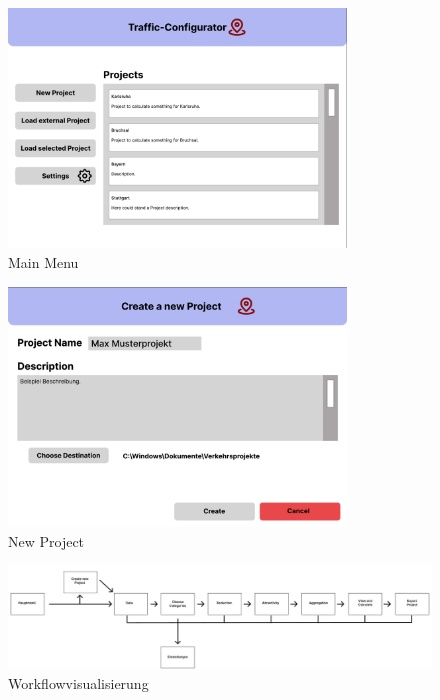 \documentclass[parskip=full]{scrartcl} %
\begin{document}
\FloatBarrier

\begin{figure}
    \centering
    \includegraphics[width=0.8\textwidth,cfbox=black 1pt 0pt]{pictures/Main Menu.png}
    \caption{Main Menu}
\end{figure}

\begin{figure}
    \centering
    \includegraphics[width=0.8\textwidth,cfbox=black 1pt 0pt]{pictures/New Project.png}
    \caption{New Project}
\end{figure}

\begin{figure}
    \centering
    \includegraphics[width=1\textwidth,cfbox=black 1pt 0pt]{pictures/WorkflowvisualisierungGUI.jpg}
    \caption{Workflowvisualisierung}
\end{figure}
\end{document}
